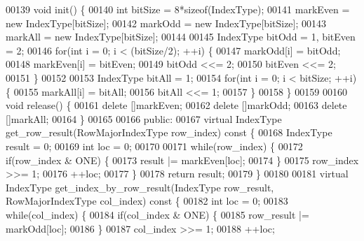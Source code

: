 \begin{DoxyCode}
00139         \textcolor{keywordtype}{void} init() \{
00140                 \textcolor{keywordtype}{int} bitSize = 8*\textcolor{keyword}{sizeof}(IndexType);
00141                 markEven = \textcolor{keyword}{new} IndexType[bitSize];
00142                 markOdd = \textcolor{keyword}{new} IndexType[bitSize];
00143                 markAll = \textcolor{keyword}{new} IndexType[bitSize];
00144 
00145                 IndexType bitOdd = 1, bitEven = 2;
00146                 \textcolor{keywordflow}{for}(\textcolor{keywordtype}{int} i = 0; i < (bitSize/2); ++i) \{
00147                         markOdd[i] = bitOdd;
00148                         markEven[i] = bitEven;
00149                         bitOdd <<= 2;
00150                         bitEven <<= 2;
00151                 \}
00152 
00153                 IndexType bitAll = 1;
00154                 \textcolor{keywordflow}{for}(\textcolor{keywordtype}{int} i = 0; i < bitSize; ++i) \{
00155                         markAll[i] = bitAll;
00156                         bitAll <<= 1;
00157                 \}
00158         \}
00159 
00160         \textcolor{keywordtype}{void} release() \{
00161                 \textcolor{keyword}{delete} []markEven;
00162                 \textcolor{keyword}{delete} []markOdd;
00163                 \textcolor{keyword}{delete} []markAll;
00164         \}
00165 
00166 \textcolor{keyword}{public}:
00167         \textcolor{keyword}{virtual} IndexType get_row_result(RowMajorIndexType row\_index)\textcolor{keyword}{ const }\{
00168                 IndexType result = 0;
00169                 \textcolor{keywordtype}{int} loc = 0;
00170 
00171                 \textcolor{keywordflow}{while}(row\_index) \{
00172                         \textcolor{keywordflow}{if}(row\_index & ONE) \{
00173                                 result |= markEven[loc];
00174                         \}
00175                         row\_index >>= 1;
00176                         ++loc;
00177                 \}
00178                 \textcolor{keywordflow}{return} result;
00179         \}
00180 
00181         \textcolor{keyword}{virtual} IndexType get_index_by_row_result(IndexType row\_result, 
      RowMajorIndexType col\_index)\textcolor{keyword}{ const }\{
00182                 \textcolor{keywordtype}{int} loc = 0;
00183                 \textcolor{keywordflow}{while}(col\_index) \{
00184                         \textcolor{keywordflow}{if}(col\_index & ONE) \{
00185                                 row\_result |= markOdd[loc];
00186                         \}
00187                         col\_index >>= 1;
00188                         ++loc;

\end{DoxyCode}
